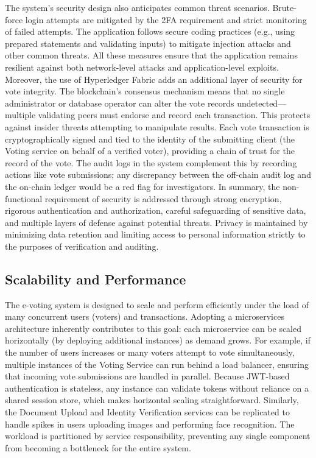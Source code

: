 \documentclass[a4paper,10pt]{report}
\begin{document}
The system’s security design also anticipates common threat scenarios. Brute-force login attempts are mitigated by the 2FA requirement and strict monitoring of failed attempts. The application follows secure coding practices (e.g., using prepared statements and validating inputs) to mitigate injection attacks and other common threats. All these measures ensure that the application remains resilient against both network-level attacks and application-level exploits. Moreover, the use of Hyperledger Fabric adds an additional layer of security for vote integrity. The blockchain’s consensus mechanism means that no single administrator or database operator can alter the vote records undetected—multiple validating peers must endorse and record each transaction. This protects against insider threats attempting to manipulate results. Each vote transaction is cryptographically signed and tied to the identity of the submitting client (the Voting service on behalf of a verified voter), providing a chain of trust for the record of the vote. The audit logs in the system complement this by recording actions like vote submissions; any discrepancy between the off-chain audit log and the on-chain ledger would be a red flag for investigators. In summary, the non-functional requirement of security is addressed through strong encryption, rigorous authentication and authorization, careful safeguarding of sensitive data, and multiple layers of defense against potential threats. Privacy is maintained by minimizing data retention and limiting access to personal information strictly to the purposes of verification and auditing.

\subsection{Scalability and Performance}
The e-voting system is designed to scale and perform efficiently under the load of many concurrent users (voters) and transactions. Adopting a microservices architecture inherently contributes to this goal: each microservice can be scaled horizontally (by deploying additional instances) as demand grows. For example, if the number of users increases or many voters attempt to vote simultaneously, multiple instances of the Voting Service can run behind a load balancer, ensuring that incoming vote submissions are handled in parallel. Because JWT-based authentication is stateless, any instance can validate tokens without reliance on a shared session store, which makes horizontal scaling straightforward. Similarly, the Document Upload and Identity Verification services can be replicated to handle spikes in users uploading images and performing face recognition. The workload is partitioned by service responsibility, preventing any single component from becoming a bottleneck for the entire system.
\end{document}
